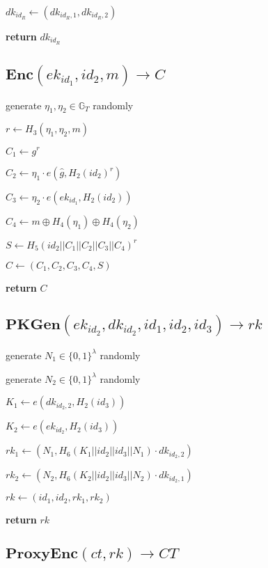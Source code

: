 \documentclass[a4paper]{article}
\begin{document}
$\textit{dk}_{\textit{id}_R} \gets (\textit{dk}_{\textit{id}_R, 1}, \textit{dk}_{\textit{id}_R, 2})$

\textbf{return} $\textit{dk}_{\textit{id}_R}$

\subsection{$\textbf{Enc}(\textit{ek}_{\textit{id}_1}, \textit{id}_2, m) \rightarrow C$}

generate $\eta_1, \eta_2 \in \mathbb{G}_T$ randomly

$r \gets H_3(\eta_1, \eta_2, m)$

$C_1 \gets g^r$

$C_2 \gets \eta_1 \cdot e(\hat{g}, H_2(\textit{id}_2)^r)$

$C_3 \gets \eta_2 \cdot e(\textit{ek}_{\textit{id}_1}, H_2(\textit{id}_2))$

$C_4 \gets m \oplus H_4(\eta_1) \oplus H_4(\eta_2)$

$S \gets H_5(\textit{id}_2 || C_1 || C_2 || C_3 || C_4)^r$

$C \gets (C_1, C_2, C_3, C_4, S)$

\textbf{return} $C$

\subsection{$\textbf{PKGen}(\textit{ek}_{\textit{id}_2}, \textit{dk}_{\textit{id}_2}, \textit{id}_1, \textit{id}_2, \textit{id}_3) \rightarrow \textit{rk}$}

generate $N_1 \in \{0, 1\}^\lambda$ randomly

generate $N_2 \in \{0, 1\}^\lambda$ randomly

$K_1 \gets e(\textit{dk}_{\textit{id}_2, 2}, H_2(\textit{id}_3))$

$K_2 \gets e(\textit{ek}_{\textit{id}_2}, H_2(\textit{id}_3))$

$\textit{rk}_1 \gets (N_1, H_6(K_1 || \textit{id}_2 || \textit{id}_3 || N_1) \cdot \textit{dk}_{\textit{id}_2, 2})$

$\textit{rk}_2 \gets (N_2, H_6(K_2 || \textit{id}_2 || \textit{id}_3 || N_2) \cdot \textit{dk}_{\textit{id}_2, 1})$

$\textit{rk} \gets (\textit{id}_1, \textit{id}_2, \textit{rk}_1, \textit{rk}_2)$

\textbf{return} $\textit{rk}$

\subsection{$\textbf{ProxyEnc}(\textit{ct}, \textit{rk}) \rightarrow \textit{CT}$}
\end{document}
